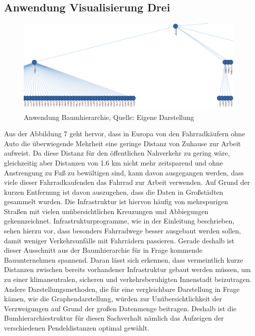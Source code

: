 \documentclass[usegeometry=true]{scrartcl}
\begin{document}
\subsection{Anwendung Visualisierung Drei}
\begin{figure}[h]
\begin{center}
\includegraphics[width=16cm]{Bilder/BaumhierarchieA3.png}
\caption{Anwendung Baumhierarchie, Quelle: Eigene Darstellung}
\end{center}
\end{figure}
Aus der Abbildung 7 geht hervor, dass in Europa von den Fahrradkäufern ohne Auto die überwiegende Mehrheit eine geringe Distanz von Zuhause zur Arbeit aufweist. Da diese Distanz für den öffentlichen Nahverkehr zu gering wäre, gleichzeitig aber Distanzen von 1.6 km nicht mehr zeitsparend und ohne Anstrengung zu Fuß zu bewältigen sind, kann davon ausgegangen werden, dass viele dieser Fahrradkaufenden das Fahrrad zur Arbeit verwenden. Auf Grund der kurzen Entfernung ist davon auszugehen, dass die Daten in Großstädten gesammelt wurden. Die Infrastruktur ist hiervon häufig von mehrspurigen Straßen mit vielen unübersichtlichen Kreuzungen und Abbiegungen gekennzeichnet. Infrastrukturprogramme, wie in der Einleitung beschrieben, sehen hierzu vor, dass besonders Fahrradwege besser ausgebaut werden sollen, damit weniger Verkehrsunfälle mit Fahrrädern passieren. Gerade deshalb ist dieser Ausschnitt aus der Baumhierarchie für in Frage kommende Bauunternehmen spannend. Daran lässt sich erkennen, dass vermeintlich kurze Distanzen zwischen bereits vorhandener Infrastruktur gebaut werden müssen, um zu einer klimaneutralen, sicheren und verkehrsberuhigten Innenstadt beizutragen. 
Andere Darstellungsmethoden, die für eine vergleichbare Darstellung in Frage kämen, wie die Graphendarstellung, würden zur Unübersichtlichkeit der Verzweigungen auf Grund der großen Datenmenge beitragen. Deshalb ist die Bumhierarchiestruktur für diesen Sachverhalt nämlich das Aufzeigen der verschiedenen Pendeldistanzen optimal gewählt. 
\end{document}
